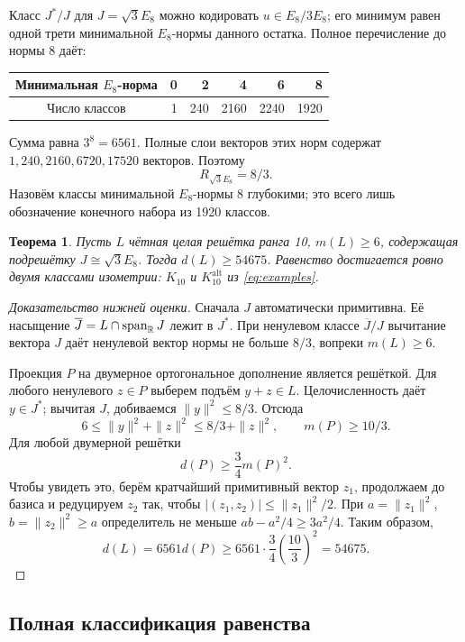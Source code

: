 \documentclass[11pt,a4paper]{article}
\newtheorem{theorem}{Теорема}[section]
\theoremstyle{remark}\newtheorem{remark}[theorem]{Замечание}
\newcommand{\spanR}{\operatorname{span}_{\R}}\newcommand{\diag}{\operatorname{diag}}
\newcommand{\Kalt}{K_{10}^{\mathrm{alt}}}
\begin{document}
Класс $J^*/J$ для $J=\sqrt3E_8$ можно кодировать $u\in E_8/3E_8$; его минимум равен одной трети минимальной $E_8$-нормы данного остатка. Полное перечисление до нормы 8 даёт:
\begin{center}
\begin{tabular}{crrrrr}
\toprule
Минимальная $E_8$-норма &0&2&4&6&8\\\midrule
Число классов &1&240&2160&2240&1920\\
\bottomrule
\end{tabular}
\end{center}
Сумма равна $3^8=6561$. Полные слои векторов этих норм содержат $1,240,2160,6720,17520$ векторов. Поэтому
\begin{equation}\label{eq:e8radius}
R_{\sqrt3E_8}=8/3.
\end{equation}
Назовём классы минимальной $E_8$-нормы 8 глубокими; это всего лишь обозначение конечного набора из 1920 классов.

\begin{theorem}\label{thm:rank10e8}
Пусть $L$ чётная целая решётка ранга 10, $m(L)\ge6$, содержащая подрешётку $J\cong\sqrt3E_8$. Тогда $d(L)\ge54675$. Равенство достигается ровно двумя классами изометрии: $K_{10}$ и $\Kalt$ из \eqref{eq:examples}.
\end{theorem}

\begin{proof}[Доказательство нижней оценки]
Сначала $J$ автоматически примитивна. Её насыщение $\overline J=L\cap\spanR J$ лежит в $J^*$. При ненулевом классе $\overline J/J$ вычитание вектора $J$ даёт ненулевой вектор нормы не больше $8/3$, вопреки $m(L)\ge6$.

Проекция $P$ на двумерное ортогональное дополнение является решёткой. Для любого ненулевого $z\in P$ выберем подъём $y+z\in L$. Целочисленность даёт $y\in J^*$; вычитая $J$, добиваемся $\|y\|^2\le8/3$. Отсюда
\[
6\le\|y\|^2+\|z\|^2\le8/3+\|z\|^2,
\qquad m(P)\ge10/3.
\]
Для любой двумерной решётки
\[
d(P)\ge\frac34m(P)^2.
\]
Чтобы увидеть это, берём кратчайший примитивный вектор $z_1$, продолжаем до базиса и редуцируем $z_2$ так, чтобы $|(z_1,z_2)|\le\|z_1\|^2/2$. При $a=\|z_1\|^2$, $b=\|z_2\|^2\ge a$ определитель не меньше $ab-a^2/4\ge3a^2/4$. Таким образом,
\[
d(L)=6561d(P)\ge6561\cdot\frac34\left(\frac{10}{3}\right)^2=54675.
\]
\end{proof}

\subsection{Полная классификация равенства}
\end{document}
